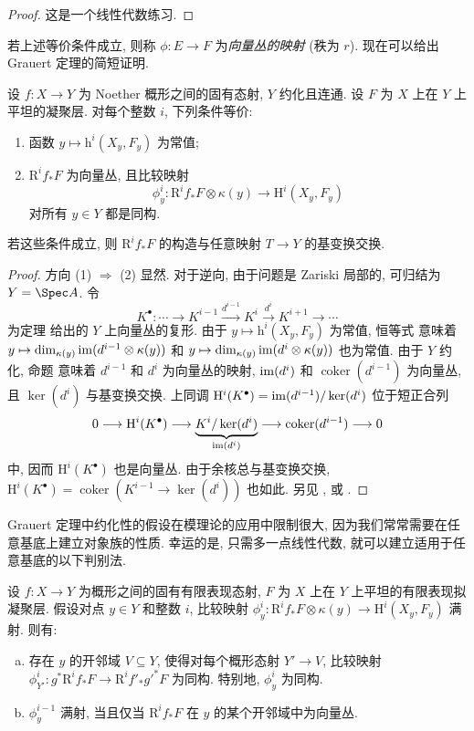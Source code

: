 \begin{proof}
这是一个线性代数练习.
\end{proof}
若上述等价条件成立, 则称 $\phi:E\to F$ 为\textit{向量丛的映射} (秩为 $r$). 现在可以给出 Grauert 定理的简短证明.
\begin{theorem}[Grauert 定理]\label{src:A.6.7}
设 $f:X\to Y$ 为 Noether 概形之间的固有态射, $Y$ 约化且连通. 设 $F$ 为 $X$ 上在 $Y$ 上平坦的凝聚层. 对每个整数 $i$, 下列条件等价:
\begin{enumerate}[(1)]
\item 函数 $y\mapsto\mathrm h^i(X_y,F_y)$ 为常值;
\item $\mathrm R^if_*F$ 为向量丛, 且比较映射
\[
\phi_y^i:\mathrm R^if_*F\otimes\kappa(y)\longrightarrow\mathrm H^i(X_y,F_y)
\]
对所有 $y\in Y$ 都是同构.
\end{enumerate}
若这些条件成立, 则 $\mathrm R^if_*F$ 的构造与任意映射 $T\to Y$ 的基变换交换.
\end{theorem}
\begin{proof}
方向 (1) $\Rightarrow$ (2) 显然. 对于逆向, 由于问题是 Zariski 局部的, 可归结为 $Y=\Spec A$. 令
\[
K^\bullet:\cdots\longrightarrow K^{i-1}\xrightarrow{d^{i-1}}K^i\xrightarrow{d^i}K^{i+1}\longrightarrow\cdots
\]
为定理  给出的 $Y$ 上向量丛的复形. 由于 $y\mapsto\mathrm h^i(X_y,F_y)$ 为常值, 恒等式  意味着 $y\mapsto\dim_{\kappa(y)}\operatorname{im}(d^{i-1}\otimes\kappa(y))$ 和 $y\mapsto\dim_{\kappa(y)}\operatorname{im}(d^i\otimes\kappa(y))$ 也为常值. 由于 $Y$ 约化, 命题  意味着 $d^{i-1}$ 和 $d^i$ 为向量丛的映射, $\operatorname{im}(d^i)$ 和 $\operatorname{coker}(d^{i-1})$ 为向量丛, 且 $\ker(d^i)$ 与基变换交换. 上同调 $\mathrm H^i(K^\bullet)=\operatorname{im}(d^{i-1})/\ker(d^i)$ 位于短正合列
\[
0\longrightarrow\mathrm H^i(K^\bullet)\longrightarrow\underbrace{K^i/\ker(d^i)}_{\operatorname{im}(d^i)}\longrightarrow\operatorname{coker}(d^{i-1})\longrightarrow0
\]
中, 因而 $\mathrm H^i(K^\bullet)$ 也是向量丛. 由于余核总与基变换交换, $\mathrm H^i(K^\bullet)=\operatorname{coker}(K^{i-1}\to\ker(d^i))$ 也如此. 另见 \cite[推论 $2$, 第 $48$ 页]{Mum70a}, \cite[推论 $12.9$]{Har77} 或 \cite[$28.1.5$]{Vak17}.
\end{proof}
Grauert 定理中约化性的假设在模理论的应用中限制很大, 因为我们常常需要在任意基底上建立对象族的性质. 幸运的是, 只需多一点线性代数, 就可以建立适用于任意基底的以下判别法.
\begin{theorem}[上同调与基变换 II]\label{src:A.6.8}
设 $f:X\to Y$ 为概形之间的固有有限表现态射, $F$ 为 $X$ 上在 $Y$ 上平坦的有限表现拟凝聚层. 假设对点 $y\in Y$ 和整数 $i$, 比较映射 $\phi_y^i:\mathrm R^if_*F\otimes\kappa(y)\to\mathrm H^i(X_y,F_y)$ 满射. 则有:
\begin{enumerate}[(a)]
\item 存在 $y$ 的开邻域 $V\subseteq Y$, 使得对每个概形态射 $Y'\to V$, 比较映射 $\phi_{Y'}^i:g^*\mathrm R^if_*F\to\mathrm R^if'_*g'^*F$ 为同构. 特别地, $\phi_y^i$ 为同构.
\item $\phi_y^{i-1}$ 满射, 当且仅当 $\mathrm R^if_*F$ 在 $y$ 的某个开邻域中为向量丛.
\end{enumerate}
\end{theorem}
